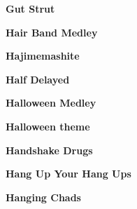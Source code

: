 \newline
\vspace{10pt} 
\begin{center}\textbf{Gut Strut}\end{center}
\newline
\vspace{10pt} 
\begin{center}\textbf{Hair Band Medley}\end{center}
\newline
\vspace{10pt} 
\begin{center}\textbf{Hajimemashite}\end{center}
\newline
\vspace{10pt} 
\begin{center}\textbf{Half Delayed}\end{center}
\newline
\vspace{10pt} 
\begin{center}\textbf{Halloween Medley}\end{center}
\newline
\vspace{10pt} 
\begin{center}\textbf{Halloween theme}\end{center}
\newline
\vspace{10pt} 
\begin{center}\textbf{Handshake Drugs}\end{center}
\newline
\vspace{10pt} 
\begin{center}\textbf{Hang Up Your Hang Ups}\end{center}
\newline
\vspace{10pt} 
\begin{center}\textbf{Hanging Chads}\end{center}
\newline
\vspace{10pt} 
